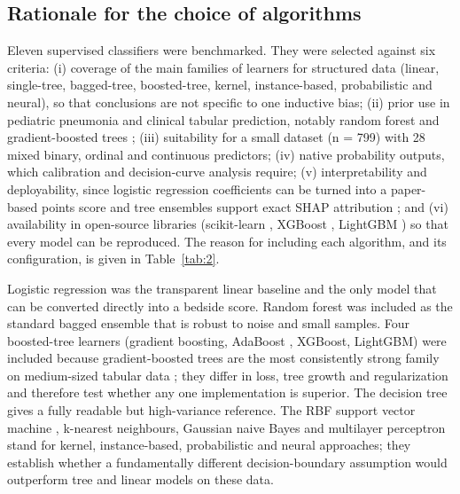 \documentclass[a4paper,fleqn]{cas-dc}
\begin{document}
\subsection{Rationale for the choice of algorithms}
\label{sec:alg}

Eleven supervised classifiers were benchmarked. They were selected against six criteria: (i) coverage of the main families of learners for structured data (linear, single-tree, bagged-tree, boosted-tree, kernel, instance-based, probabilistic and neural), so that conclusions are not specific to one inductive bias; (ii) prior use in pediatric pneumonia and clinical tabular prediction, notably random forest \cite{r4} and gradient-boosted trees \cite{r7}; (iii) suitability for a small dataset (n = 799) with 28 mixed binary, ordinal and continuous predictors; (iv) native probability outputs, which calibration and decision-curve analysis require; (v) interpretability and deployability, since logistic regression coefficients can be turned into a paper-based points score and tree ensembles support exact SHAP attribution \cite{r24}; and (vi) availability in open-source libraries (scikit-learn \cite{r23}, XGBoost \cite{r19}, LightGBM \cite{r20}) so that every model can be reproduced. The reason for including each algorithm, and its configuration, is given in Table~\ref{tab:2}.

Logistic regression was the transparent linear baseline and the only model that can be converted directly into a bedside score. Random forest \cite{r18} was included as the standard bagged ensemble that is robust to noise and small samples. Four boosted-tree learners (gradient boosting, AdaBoost \cite{r31}, XGBoost, LightGBM) were included because gradient-boosted trees are the most consistently strong family on medium-sized tabular data \cite{r25}; they differ in loss, tree growth and regularization and therefore test whether any one implementation is superior. The decision tree gives a fully readable but high-variance reference. The RBF support vector machine \cite{r32}, k-nearest neighbours, Gaussian naive Bayes and multilayer perceptron stand for kernel, instance-based, probabilistic and neural approaches; they establish whether a fundamentally different decision-boundary assumption would outperform tree and linear models on these data.
\end{document}
